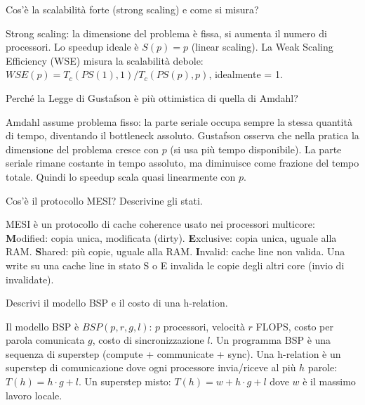 \documentclass[11pt,a4paper]{article}
\theoremstyle{remark}
\newenvironment{esercizio}[1][]{%
  \begin{tcolorbox}[breakable,title={\textbf{Esercizio / Domanda d'esame}\ifx&#1&\else: #1\fi},
    colback=yellow!5!white, colframe=orange!75!black, fonttitle=\small\bfseries]%
}{%
  \end{tcolorbox}%
}
\newenvironment{risposta}{%
  \begin{tcolorbox}[breakable,title={\textbf{Risposta}},
    colback=green!5!white, colframe=green!50!black, fonttitle=\small\bfseries]%
}{%
  \end{tcolorbox}%
}
\begin{document}
\begin{esercizio}
Cos'è la scalabilità forte (strong scaling) e come si misura?
\end{esercizio}
\begin{risposta}
Strong scaling: la dimensione del problema è fissa, si aumenta il numero di processori. Lo speedup ideale è $S(p) = p$ (linear scaling). La Weak Scaling Efficiency (WSE) misura la scalabilità debole: $WSE(p) = T_c(PS(1),1)/T_c(PS(p),p)$, idealmente = 1.
\end{risposta}

\begin{esercizio}
Perché la Legge di Gustafson è più ottimistica di quella di Amdahl?
\end{esercizio}
\begin{risposta}
Amdahl assume problema fisso: la parte seriale occupa sempre la stessa quantità di tempo, diventando il bottleneck assoluto. Gustafson osserva che nella pratica la dimensione del problema cresce con $p$ (si usa più tempo disponibile). La parte seriale rimane costante in tempo assoluto, ma diminuisce come frazione del tempo totale. Quindi lo speedup scala quasi linearmente con $p$.
\end{risposta}

\begin{esercizio}
Cos'è il protocollo MESI? Descrivine gli stati.
\end{esercizio}
\begin{risposta}
MESI è un protocollo di cache coherence usato nei processori multicore:
\textbf{M}odified: copia unica, modificata (dirty). \textbf{E}xclusive: copia unica, uguale alla RAM. \textbf{S}hared: più copie, uguale alla RAM. \textbf{I}nvalid: cache line non valida.
Una write su una cache line in stato S o E invalida le copie degli altri core (invio di invalidate).
\end{risposta}

\begin{esercizio}
Descrivi il modello BSP e il costo di una h-relation.
\end{esercizio}
\begin{risposta}
Il modello BSP è $BSP(p,r,g,l)$: $p$ processori, velocità $r$ FLOPS, costo per parola comunicata $g$, costo di sincronizzazione $l$. Un programma BSP è una sequenza di superstep (compute + communicate + sync). Una h-relation è un superstep di comunicazione dove ogni processore invia/riceve al più $h$ parole: $T(h) = h \cdot g + l$. Un superstep misto: $T(h) = w + h \cdot g + l$ dove $w$ è il massimo lavoro locale.
\end{risposta}
\end{document}
